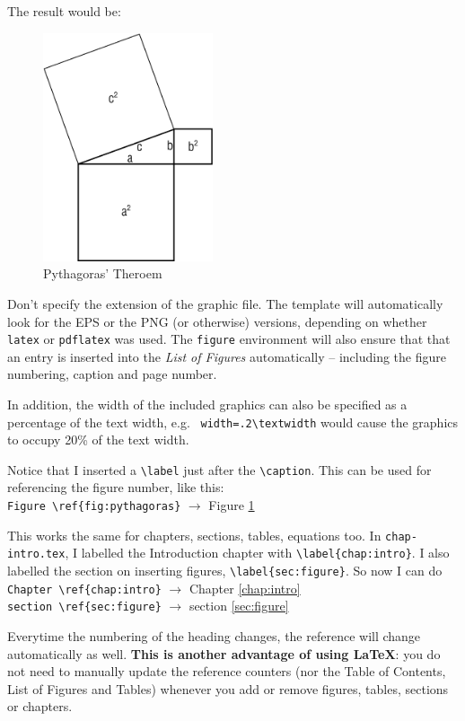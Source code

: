 The result would be:

\begin{figure}[hbt!]\centering
\includegraphics[width=50mm]{pythag.png}
\caption{Pythagoras' Theroem} \label{fig:pythagoras}
\end{figure}

Don't specify the extension of the graphic file.  The template will automatically look for the EPS or the PNG (or otherwise) versions, depending on whether \verb|latex| or \verb|pdflatex| was used.  The \texttt{figure} environment will also ensure that that an entry is inserted into the \emph{List of Figures} automatically -- including the figure numbering, caption and page number.

In addition, the width of the included graphics can also be specified as a percentage of the text width, e.g.~ \verb|width=.2\textwidth| would cause the graphics to occupy 20\% of the text width.

Notice that I inserted a \verb|\label| just after the \verb|\caption|.  This can be used for referencing the figure number, like this: \\
\verb|Figure \ref{fig:pythagoras}| $\to$ Figure \ref{fig:pythagoras}

This works the same for chapters, sections, tables, equations too.  In \verb|chap-intro.tex|, I labelled the Introduction chapter with \verb|\label{chap:intro}|.  I also labelled the section on inserting figures, \verb|\label{sec:figure}|.  So now I can do \\
\verb|Chapter \ref{chap:intro}| $\to$  Chapter \ref{chap:intro} \\
\verb|section \ref{sec:figure}| $\to$  section \ref{sec:figure}

Everytime the numbering of the heading changes, the reference will change automatically as well.  \textbf{This is another advantage of using \LaTeX{}}: you do not need to manually update the reference counters (nor the Table of Contents, List of Figures and Tables) whenever you add or remove figures, tables, sections or chapters.


